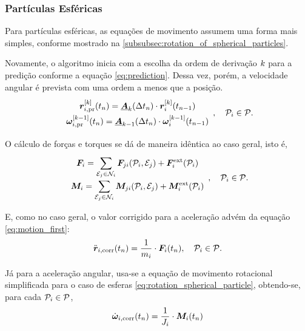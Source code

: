 \subsubsection*{Partículas Esféricas}

Para partículas esféricas, as equações de movimento assumem uma forma mais simples, conforme mostrado na \autoref{subsubsec:rotation_of_spherical_particles}. 

Novamente, o algoritmo inicia com a escolha da ordem de derivação \(k\) para a predição conforme a equação \eqref{eq:prediction}. Dessa vez, porém, a velocidade angular é prevista com uma ordem a menos que a posição.
\begin{equation*}
	\def\arraystretch{1.5}
	\begin{array}{c}
		\drvec{\taylorOrder}{\positionipr}\pqty{\instant[n]} = \extrapolationMatrix{\taylorOrder}[\Dt[n]]\cdot\drvec{\taylorOrder}{\positioni}\pqty{\instant[n-1]} \\
		\drvec{\taylorOrder-1}{\angularVelocityipr}\pqty{\instant[n]} = \extrapolationMatrix{\taylorOrder-1}[\Dt[n]]\cdot\drvec{\taylorOrder-1}{\angularVelocityi}\pqty{\instant[n-1]} \\
	\end{array}, \quad \particlei\in\particleSet.
\end{equation*}

O cálculo de forças e torques se dá de maneira idêntica ao caso geral, isto é,
\begin{equation*}
	\def\arraystretch{1.5}
	\begin{array}{c}
		\resultingForcei = \dsum_{\elementj\in\neighborhoodi}\forceji\pqty{\particlei, \elementj} + \external\forcei\pqty{\particlei}\\
		\resultingTorquei = \dsum_{\elementj\in\neighborhoodi}\torqueji\pqty{\particlei, \elementj} + \external\torquei\pqty{\particlei}
	\end{array}, \quad \particlei\in\particleSet.
\end{equation*}

E, como no caso geral, o valor corrigido para a aceleração advém da equação \eqref{eq:motion_first}:
\begin{equation*}
	\accelerationicorr\pqty{\instant[n]} = \dfrac{1}{\massi}\cdot\resultingForcei\pqty{\instant[n]}, \quad\particlei\in\particleSet.
\end{equation*}

Já para a aceleração angular, usa-se a equação de movimento rotacional simplificada para o caso de esferas \eqref{eq:rotation_spherical_particle}, obtendo-se, para cada \(\particlei\in\particleSet\),
\begin{equation*}
	\dangularVelocityicorr{1}\pqty{\instant[n]} = \dfrac{1}{\momentOfInertiai}\cdot\resultingTorquei\pqty{\instant[n]}
\end{equation*}

